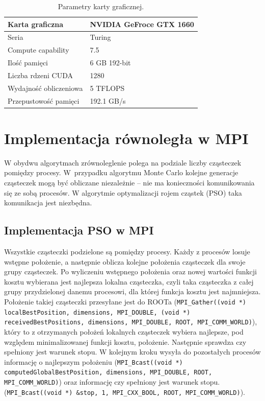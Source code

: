 \documentclass[11pt, a4paper, oneside]{article}
\begin{document}
\begin{table}[h]
\centering
\begin{tabular}{|l|l|}
\hline
Karta graficzna          & NVIDIA GeFroce GTX 1660 \\ \hline
Seria     & Turing                              \\ \hline
Compute capability    & 7.5                             \\ \hline
Ilość pamięci   & 6 GB 192-bit                                 \\ \hline
Liczba rdzeni CUDA & 1280      \\ \hline
Wydajność obliczeniowa			  & 5 TFLOPS						        \\ \hline
Przepustowość pamięci			  & 192.1 GB/s						        \\ \hline
\end{tabular}
\caption{Parametry karty graficznej.}
\label{tab:par-gpu}
\end{table}


\section{Implementacja równoległa w MPI}

W obydwu algorytmach zrównoleglenie polega na podziale liczby cząsteczek pomiędzy procesy. W~przypadku algorytmu Monte Carlo kolejne generacje cząsteczek mogą być obliczane niezależnie -- nie ma konieczności komunikowania się ze sobą procesów. W algorytmie optymalizacji rojem cząstek (PSO) taka komunikacja jest niezbędna. 


\subsection{Implementacja PSO w MPI}

Wszystkie cząsteczki podzielone są pomiędzy procesy. Każdy z procesów losuje wstępne położenie, a następnie oblicza kolejne położenia cząsteczek dla swoje grupy cząsteczek. Po wyliczeniu wstępnego położenia oraz nowej wartości funkcji kosztu wybierana jest najlepsza lokalna cząsteczka, czyli taka cząsteczka z całej grupy przydzielonej danemu procesowi, dla której funkcja kosztu jest najmniejsza. Położenie takiej cząsteczki przesyłane jest do ROOTa (\lstinline[style=mycpp]{MPI_Gather((void *) localBestPosition, dimensions, MPI_DOUBLE, (void *) receivedBestPositions, dimensions, MPI_DOUBLE, ROOT, MPI_COMM_WORLD)}), który to z otrzymanych położeń lokalnych cząsteczek wybiera najlepsze, pod względem minimalizowanej funkcji kosztu, położenie. Następnie sprawdza czy spełniony jest warunek stopu. W kolejnym kroku wysyła do pozostałych procesów informację o najlepszym położeniu (\lstinline[style=mycpp]{MPI_Bcast((void *) computedGlobalBestPosition, dimensions, MPI_DOUBLE, ROOT, MPI_COMM_WORLD)}) oraz informację czy spełniony jest warunek stopu. (\lstinline[style=mycpp]{MPI_Bcast((void *) &stop, 1, MPI_CXX_BOOL, ROOT, MPI_COMM_WORLD)}).
\end{document}
